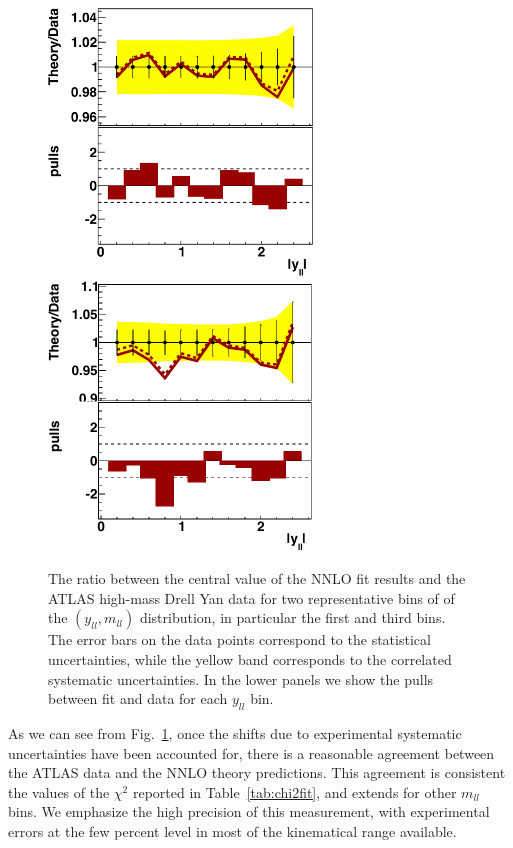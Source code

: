 \begin{figure}[h]
\centering
\includegraphics[width=7cm]{figs/data_rap1.pdf}
\includegraphics[width=7cm]{figs/data_rap3.pdf} 
\caption{The ratio between the central value of the NNLO fit results
  and the ATLAS high-mass Drell Yan data
  for two representative bins of of the $(y_{ll},m_{ll})$ distribution,
  in particular the first and third bins.
  The error bars on the data points correspond to the statistical
  uncertainties, while the yellow band
  corresponds to the correlated systematic uncertainties.
  In the lower panels we show the pulls between fit and data for each $y_{ll}$
  bin.
}
\label{hmDY_2D}
\end{figure}

As we can see from Fig.~\ref{hmDY_2D}, once the shifts due to experimental systematic
uncertainties have been accounted for, there is a reasonable agreement
between the ATLAS data and the NNLO theory predictions.
%
This agreement is consistent the values of the $\chi^2$ reported in
Table~\ref{tab:chi2fit}, and extends for other $m_{ll}$ bins.
%
We emphasize the high precision of this measurement, with experimental
errors at the few percent level in most of the kinematical range available.

